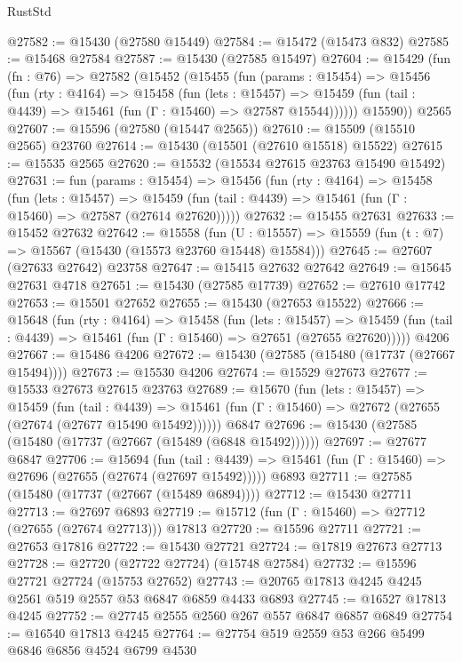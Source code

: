 \begin{lexlean}{RustStd}
\begin{coremodule}
@27582 := @15430 (@27580 @15449)
@27584 := @15472 (@15473 @832)
@27585 := @15468 @27584
@27587 := @15430 (@27585 @15497)
@27604 := @15429
    (fun (fn : @76) =>
    @27582
      (@15452
        (@15455
          (fun (params : @15454) =>
          @15456
            (fun (rty : @4164) =>
            @15458
              (fun (lets : @15457) =>
              @15459 (fun (tail : @4439) => @15461 (fun (Γ : @15460) => @27587 @15544))))))
        @15590))
    @2565
@27607 := @15596 (@27580 (@15447 @2565))
@27610 := @15509 (@15510 @2565) @23760
@27614 := @15430 (@15501 (@27610 @15518) @15522)
@27615 := @15535 @2565
@27620 := @15532 (@15534 @27615 @23763 @15490 @15492)
@27631 := fun (params : @15454) =>
  @15456
    (fun (rty : @4164) =>
    @15458
      (fun (lets : @15457) =>
      @15459 (fun (tail : @4439) => @15461 (fun (Γ : @15460) => @27587 (@27614 @27620)))))
@27632 := @15455 @27631
@27633 := @15452 @27632
@27642 := @15558
    (fun (U : @15557) => @15559 (fun (t : @7) => @15567 (@15430 (@15573 @23760 @15448) @15584)))
@27645 := @27607 (@27633 @27642) @23758
@27647 := @15415 @27632 @27642
@27649 := @15645 @27631 @4718
@27651 := @15430 (@27585 @17739)
@27652 := @27610 @17742
@27653 := @15501 @27652
@27655 := @15430 (@27653 @15522)
@27666 := @15648
    (fun (rty : @4164) =>
    @15458
      (fun (lets : @15457) =>
      @15459 (fun (tail : @4439) => @15461 (fun (Γ : @15460) => @27651 (@27655 @27620)))))
    @4206
@27667 := @15486 @4206
@27672 := @15430 (@27585 (@15480 (@17737 (@27667 @15494))))
@27673 := @15530 @4206
@27674 := @15529 @27673
@27677 := @15533 @27673 @27615 @23763
@27689 := @15670
    (fun (lets : @15457) =>
    @15459
      (fun (tail : @4439) =>
      @15461 (fun (Γ : @15460) => @27672 (@27655 (@27674 (@27677 @15490 @15492))))))
    @6847
@27696 := @15430 (@27585 (@15480 (@17737 (@27667 (@15489 (@6848 @15492))))))
@27697 := @27677 @6847
@27706 := @15694
    (fun (tail : @4439) => @15461 (fun (Γ : @15460) => @27696 (@27655 (@27674 (@27697 @15492)))))
    @6893
@27711 := @27585 (@15480 (@17737 (@27667 (@15489 @6894))))
@27712 := @15430 @27711
@27713 := @27697 @6893
@27719 := @15712 (fun (Γ : @15460) => @27712 (@27655 (@27674 @27713))) @17813
@27720 := @15596 @27711
@27721 := @27653 @17816
@27722 := @15430 @27721
@27724 := @17819 @27673 @27713
@27728 := @27720 (@27722 @27724) (@15748 @27584)
@27732 := @15596 @27721 @27724 (@15753 @27652)
@27743 := @20765 @17813 @4245 @4245 @2561 @519 @2557 @53 @6847 @6859 @4433 @6893
@27745 := @16527 @17813 @4245
@27752 := @27745 @2555 @2560 @267 @557 @6847 @6857 @6849
@27754 := @16540 @17813 @4245
@27764 := @27754 @519 @2559 @53 @266 @5499 @6846 @6856 @4524 @6799 @4530

\end{coremodule}
\end{lexlean}
